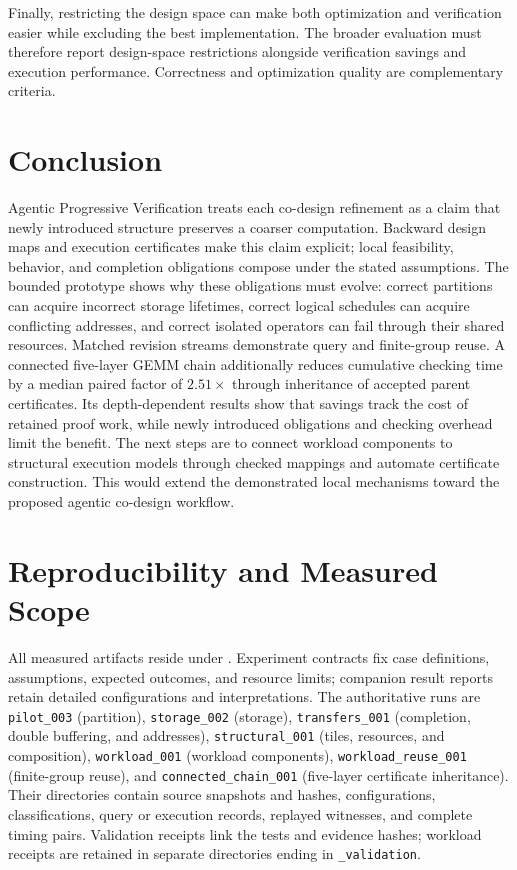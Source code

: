 \documentclass[11pt]{article}
\begin{document}
Finally, restricting the design space can make both optimization and verification easier while excluding the best implementation. The broader evaluation must therefore report design-space restrictions alongside verification savings and execution performance. Correctness and optimization quality are complementary criteria.

\section{Conclusion}
Agentic Progressive Verification treats each co-design refinement as a claim that newly introduced structure preserves a coarser computation. Backward design maps and execution certificates make this claim explicit; local feasibility, behavior, and completion obligations compose under the stated assumptions. The bounded prototype shows why these obligations must evolve: correct partitions can acquire incorrect storage lifetimes, correct logical schedules can acquire conflicting addresses, and correct isolated operators can fail through their shared resources. Matched revision streams demonstrate query and finite-group reuse. A connected five-layer GEMM chain additionally reduces cumulative checking time by a median paired factor of $2.51\times$ through inheritance of accepted parent certificates. Its depth-dependent results show that savings track the cost of retained proof work, while newly introduced obligations and checking overhead limit the benefit. The next steps are to connect workload components to structural execution models through checked mappings and automate certificate construction. This would extend the demonstrated local mechanisms toward the proposed agentic co-design workflow.

\appendix
\section{Reproducibility and Measured Scope}\label{app:reproducibility}
All measured artifacts reside under . Experiment contracts fix case definitions, assumptions, expected outcomes, and resource limits; companion result reports retain detailed configurations and interpretations. The authoritative runs are \texttt{pilot\_003} (partition), \texttt{storage\_002} (storage), \texttt{transfers\_001} (completion, double buffering, and addresses), \texttt{structural\_001} (tiles, resources, and composition), \texttt{workload\_001} (workload components), \texttt{workload\_reuse\_001} (finite-group reuse), and \texttt{connected\_chain\_001} (five-layer certificate inheritance). Their directories contain source snapshots and hashes, configurations, classifications, query or execution records, replayed witnesses, and complete timing pairs. Validation receipts link the tests and evidence hashes; workload receipts are retained in separate directories ending in \texttt{\_validation}.
\end{document}

